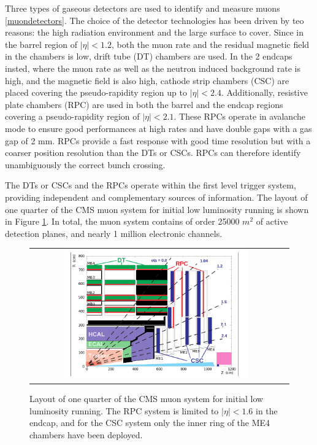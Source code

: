 Three types of gaseous detectors are used to identify and measure muons \ref{muondetectors}. The choice of the detector technologies has been driven by teo reasons: the high radiation environment and the large surface to cover. Since in the barrel region of $|\eta| < 1.2$, both the muon rate and the residual magnetic ﬁeld in the chambers is low, drift tube (DT) chambers are used. In the 2 endcaps insted, where the muon rate as well as the neutron induced background rate is high, and the magnetic ﬁeld is also high, cathode strip chambers (CSC) are placed covering the pseudo-rapidity region up to $|\eta| < 2.4$. Additionally, resistive plate chambers (RPC) are used in both the barrel and the endcap regions covering a pseudo-rapidity region of $|\eta| < 2.1$. These RPCs operate in avalanche mode to ensure good performances at high rates and have double gaps with a gas gap of 2 mm. RPCs provide a fast response with good time resolution but with a coarser position resolution than the DTs or CSCs. RPCs can therefore identify unambiguously the correct bunch crossing.

The DTs or CSCs and the RPCs operate within the ﬁrst level trigger system, providing independent and complementary sources of information.
The layout of one quarter of the CMS muon system for initial low luminosity running is shown in Figure \ref{fig:CMS_muonsys}. In total, the muon system contains of order 25000 $m^{2}$ of active detection planes, and nearly 1 million electronic channels.

\begin{figure}[tbh!]
	\centering
	\begin{tabular}{cc}
		\includegraphics[width=0.75\textwidth]{detector/pics/CMS_muonsys.png}
	\end{tabular}
	\caption{Layout of one quarter of the CMS muon system for initial low luminosity running.
		The RPC system is limited to $|\eta| < 1.6$ in the endcap, and for the CSC system only the inner
		ring of the ME4 chambers have been deployed.}
	\label{fig:CMS_muonsys}
\end{figure}

